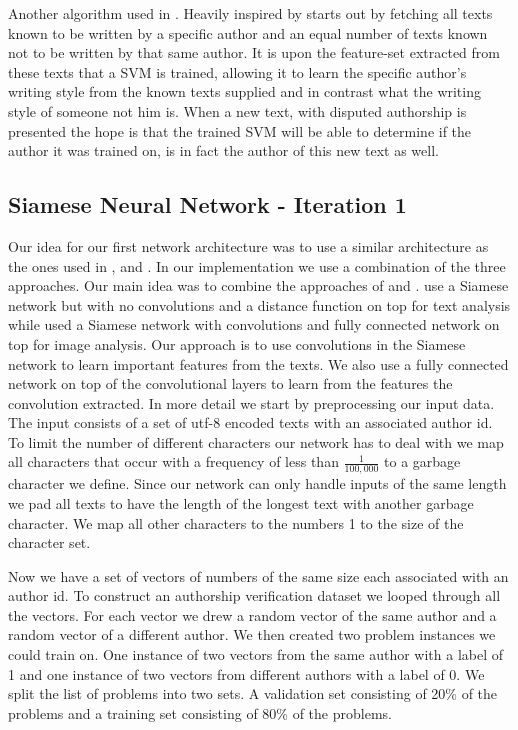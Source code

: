 Another algorithm used in \cite{US}. Heavily inspired by \cite{hansen2014}
starts out by fetching all texts known to be written by a specific author and an
equal number of texts known not to be written by that same author. It is upon
the feature-set extracted from these texts that a \gls{SVM} is trained, allowing
it to learn the specific author's writing style from the known texts supplied
and in contrast what the writing style of someone not him is. When a new text,
with disputed authorship is presented the hope is that the trained \gls{SVM}
will be able to determine if the author it was trained on, is in fact the author
of this new text as well.


\subsection{Siamese Neural Network - Iteration 1}


Our idea for our first network architecture was to use a similar architecture
as the ones used in \cite{Koch2015SiameseNN}, \cite{NIPS1993_769} and
\cite{qian:2018}. In our implementation we use a combination of the three
approaches. Our main idea was to combine the approaches of \cite{qian:2018}
and \cite{Koch2015SiameseNN}. \cite{qian:2018} use a Siamese network but
with no convolutions and a distance function on top for text analysis while
\cite{Koch2015SiameseNN} used a Siamese network with convolutions and fully
connected network on top for image analysis. Our approach is to use convolutions
in the Siamese network to learn important features from the texts. We also use
a fully connected network on top of the convolutional layers to learn from the
features the convolution extracted. In more detail we start by preprocessing
our input data. The input consists of a set of utf-8 encoded texts with an
associated author id. To limit the number of different characters our network
has to deal with we map all characters that occur with a frequency of less than
$\frac{1}{100,000}$ to a garbage character we define. Since our network can only
handle inputs of the same length we pad all texts to have the length of the
longest text with another garbage character. We map all other characters to the
numbers 1 to the size of the character set.

Now we have a set of vectors of numbers of the same size each associated with
an author id. To construct an authorship verification dataset we looped through
all the vectors. For each vector we drew a random vector of the same author and
a random vector of a different author. We then created two problem instances we
could train on. One instance of two vectors from the same author with a label of
1 and one instance of two vectors from different authors with a label of 0. We
split the list of problems into two sets. A validation set consisting of 20\% of
the problems and a training set consisting of 80\% of the problems.


